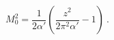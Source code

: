 \begin{equation}
M_0^2 = \frac{1}{2\alpha'}\left(\frac{z^2}{2\pi^2\alpha'}-1\right)\ .
\end{equation}

